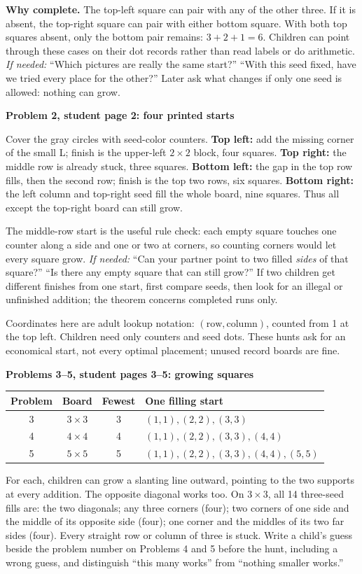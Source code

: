 \documentclass[11pt]{article}
\newcommand{\sub}[1]{\par\textbf{#1}\par}
\newcommand{\hint}[1]{\textit{If needed:} #1}
\begin{document}
\textbf{Why complete.} The top-left square can pair with any of the other three. If it is absent, the top-right square can pair with either bottom square. With both top squares absent, only the bottom pair remains: $3+2+1=6$. Children can point through these cases on their dot records rather than read labels or do arithmetic. \hint{``Which pictures are really the same start?'' ``With this seed fixed, have we tried every place for the other?''} Later ask what changes if only one seed is allowed: nothing can grow.

\sub{Problem 2, student page 2: four printed starts}
Cover the gray circles with seed-color counters. \textbf{Top left:} add the missing corner of the small L; finish is the upper-left $2\times2$ block, four squares. \textbf{Top right:} the middle row is already stuck, three squares. \textbf{Bottom left:} the gap in the top row fills, then the second row; finish is the top two rows, six squares. \textbf{Bottom right:} the left column and top-right seed fill the whole board, nine squares. Thus all except the top-right board can still grow.

The middle-row start is the useful rule check: each empty square touches one counter along a side and one or two at corners, so counting corners would let every square grow. \hint{``Can your partner point to two filled \emph{sides} of that square?'' ``Is there any empty square that can still grow?''} If two children get different finishes from one start, first compare seeds, then look for an illegal or unfinished addition; the theorem concerns completed runs only.


Coordinates here are adult lookup notation: $(\text{row},\text{column})$, counted from 1 at the top left. Children need only counters and seed dots. These hunts ask for an economical start, not every optimal placement; unused record boards are fine.

\sub{Problems 3--5, student pages 3--5: growing squares}
\begin{center}\renewcommand{\arraystretch}{1.15}
\begin{tabular}{c c c l}
Problem & Board & Fewest & One filling start\\\midrule
3 & $3\times3$ & 3 & $(1,1),(2,2),(3,3)$\\
4 & $4\times4$ & 4 & $(1,1),(2,2),(3,3),(4,4)$\\
5 & $5\times5$ & 5 & $(1,1),(2,2),(3,3),(4,4),(5,5)$
\end{tabular}\end{center}
For each, children can grow a slanting line outward, pointing to the two supports at every addition. The opposite diagonal works too. On $3\times3$, all 14 three-seed fills are: the two diagonals; any three corners (four); two corners of one side and the middle of its opposite side (four); one corner and the middles of its two far sides (four). Every straight row or column of three is stuck. Write a child's guess beside the problem number on Problems 4 and 5 before the hunt, including a wrong guess, and distinguish ``this many works'' from ``nothing smaller works.''
\end{document}
